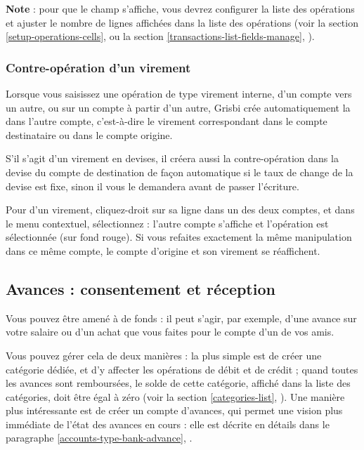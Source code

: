 \textbf{Note} : pour que le champ  s'affiche, vous devrez configurer la liste des opérations et ajuster le nombre de lignes affichées dans la liste des opérations (voir la section \vref{setup-operations-cells},  ou la section \vref{transactions-list-fields-manage}, ).


\subsubsection{Contre-opération d'un virement\label{transactions-new-transfer-associatedOperation}}

Lorsque vous saisissez une opération de type virement interne, d'un compte vers un autre, ou sur un compte à partir d'un autre, Grisbi crée automatiquement la   dans l'autre compte, c'est-à-dire le virement correspondant dans le compte destinataire ou dans le compte origine.

S'il s'agit d'un virement en devises, il créera aussi la contre-opération dans la devise du compte de destination de façon automatique si le taux de change de la devise est fixe, sinon il vous le demandera avant de passer l'écriture.  

Pour  d'un virement, cliquez-droit sur sa ligne dans un des deux comptes, et dans le menu contextuel, sélectionnez  : l'autre compte s'affiche et l'opération est sélectionnée (sur fond rouge{\couleur}). Si vous refaites exactement la même manipulation dans ce même compte, le compte d'origine et son virement se réaffichent.


\subsection{Avances : consentement et réception\label{transactions-new-advance}}

Vous pouvez être amené à  de fonds  : il peut s'agir, par exemple, d'une avance sur votre salaire ou d'un achat que vous faites pour le compte d'un de vos amis. 

Vous pouvez gérer cela de deux manières : la plus simple est de créer une catégorie dédiée, et d'y affecter les opérations de débit et de crédit ; quand toutes les avances sont remboursées, le solde de cette catégorie, affiché dans la liste des catégories, doit être égal à zéro (voir la section \vref{categories-list}, ). Une manière plus intéressante est de créer un compte d'avances, qui permet une vision plus immédiate de l'état des avances en cours : elle est décrite en détails dans le paragraphe \vref{accounts-type-bank-advance}, .


